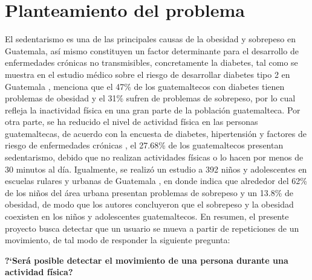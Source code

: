 \chapter{Planteamiento del problema}
El sedentarismo es una de las principales causas de la obesidad y sobrepeso en Guatemala, as\'i mismo constituyen un factor determinante para el desarrollo de enfermedades cr\'onicas no transmisibles, concretamente la diabetes, tal como se muestra en el estudio m\'edico sobre el riesgo de desarrollar diabetes tipo 2 en Guatemala  \cite{castro2017risk}, menciona que el 47\% de los guatemaltecos con diabetes tienen problemas de obesidad y el 31\%  sufren de problemas de sobrepeso, por lo cual refleja la inactividad f\'isica en una gran parte de la poblaci\'on guatemalteca.
\medbreak
Por otra parte, se ha reducido el nivel de actividad f\'isica en las personas guatemaltecas, de acuerdo con la encuesta de diabetes, hipertensi\'on y factores de riesgo de enfermedades cr\'onicas \cite{orellana2006organizacion}, el 27.68\% de los guatemaltecos presentan sedentarismo, debido que no realizan actividades f\'isicas o lo hacen por menos de 30 minutos al d\'ia.
\medbreak
Igualmente, se realiz\'o un estudio a 392 ni\~nos y adolescentes en escuelas rulares y urbanas de Guatemala \cite{muros2016doble}, en donde indica que alrededor del 62\% de los ni\~nos del  \'area urbana presentan problemas de sobrepeso y un 13.8\% de obesidad, de modo que los autores concluyeron que el sobrepeso y la obesidad coexisten en los ni\~nos y adolescentes guatemaltecos.
\medbreak
En resumen, el presente proyecto busca detectar que un usuario se mueva a partir de repeticiones de un movimiento, de tal modo de responder la siguiente pregunta:
\medbreak
\begin{center}
\textbf{?`Ser\'a posible detectar el movimiento de una persona durante una actividad f\'isica?}
\end{center}





